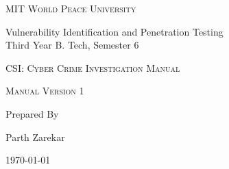 \documentclass[11pt]{article}
\begin{document}
\begin{titlepage}
    \centering


    \huge\textsc{
        MIT World Peace University
    }\\

    \vspace{0.75\baselineskip} %

    \LARGE{
        Vulnerability Identification and Penetration Testing\\
        Third Year B. Tech, Semester 6
    }

    \vfill %


    \vspace{0.79\baselineskip} %



    \huge{\textsc{
            CSI: Cyber Crime Investigation Manual
        }} \\



    \vspace{6\baselineskip} %

    \vspace{1\baselineskip} %


    \LARGE\textsc{
        Manual Version 1
    } %
    \vfill


    Prepared By
    \vspace{0.5\baselineskip} %

    \Large{
        Parth Zarekar \\
    }


    \vspace{0.5\baselineskip} %
    \today

\end{titlepage}
\end{document}

